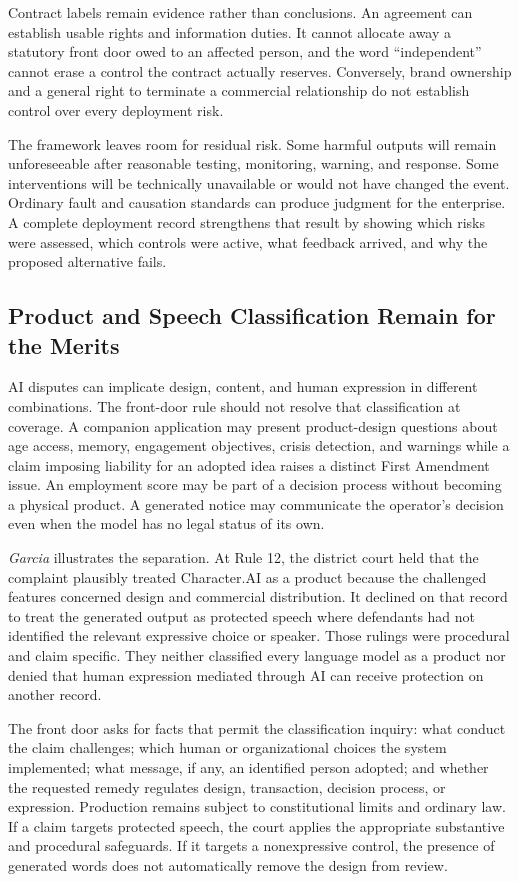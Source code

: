 Contract labels remain evidence rather than conclusions. An agreement can establish usable rights and information duties. It cannot allocate away a statutory front door owed to an affected person, and the word ``independent'' cannot erase a control the contract actually reserves. Conversely, brand ownership and a general right to terminate a commercial relationship do not establish control over every deployment risk.

The framework leaves room for residual risk. Some harmful outputs will remain unforeseeable after reasonable testing, monitoring, warning, and response. Some interventions will be technically unavailable or would not have changed the event. Ordinary fault and causation standards can produce judgment for the enterprise. A complete deployment record strengthens that result by showing which risks were assessed, which controls were active, what feedback arrived, and why the proposed alternative fails.

\subsection{Product and Speech Classification Remain for the Merits}

AI disputes can implicate design, content, and human expression in different combinations. The front-door rule should not resolve that classification at coverage. A companion application may present product-design questions about age access, memory, engagement objectives, crisis detection, and warnings while a claim imposing liability for an adopted idea raises a distinct First Amendment issue. An employment score may be part of a decision process without becoming a physical product. A generated notice may communicate the operator's decision even when the model has no legal status of its own.

\emph{Garcia} illustrates the separation. At Rule 12, the district court held that the complaint plausibly treated Character.AI as a product because the challenged features concerned design and commercial distribution. It declined on that record to treat the generated output as protected speech where defendants had not identified the relevant expressive choice or speaker. Those rulings were procedural and claim specific. They neither classified every language model as a product nor denied that human expression mediated through AI can receive protection on another record.

The front door asks for facts that permit the classification inquiry: what conduct the claim challenges; which human or organizational choices the system implemented; what message, if any, an identified person adopted; and whether the requested remedy regulates design, transaction, decision process, or expression. Production remains subject to constitutional limits and ordinary law. If a claim targets protected speech, the court applies the appropriate substantive and procedural safeguards. If it targets a nonexpressive control, the presence of generated words does not automatically remove the design from review.

